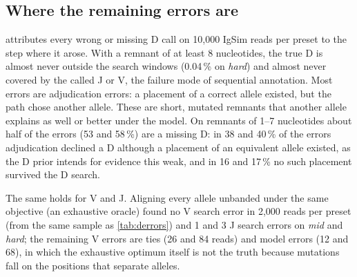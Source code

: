 \documentclass[11pt,a4paper]{article}
\begin{document}
\subsection{Where the remaining errors are}
\label{sec:errors}

 attributes every wrong or missing D call on 10,000 IgSim
reads per preset to the step where it arose. With a remnant of at least 8
nucleotides, the true D is almost never outside the search windows (0.04\,\%
on \emph{hard}) and almost never covered by the called J or V, the failure
mode of sequential annotation. Most errors are adjudication errors: a
placement of a correct allele existed, but the path chose another allele.
These are short, mutated remnants that another allele explains as well or
better under the model. On remnants of 1--7 nucleotides about half of the
errors (53 and 58\,\%) are a missing D: in 38 and 40\,\% of the errors
adjudication declined a D although a placement of an equivalent allele
existed, as the D prior intends for evidence this weak, and in 16 and
17\,\% no such placement survived the D search.

The same holds for V and J. Aligning every allele unbanded under the same
objective (an exhaustive oracle) found no V search error in 2,000 reads per
preset (from the same sample as \cref{tab:derrors}) and 1 and 3 J search
errors on \emph{mid} and \emph{hard}; the
remaining V errors are ties (26 and 84 reads) and model errors (12 and 68),
in which the exhaustive optimum itself is not the truth because mutations
fall on the positions that separate alleles.
\end{document}
